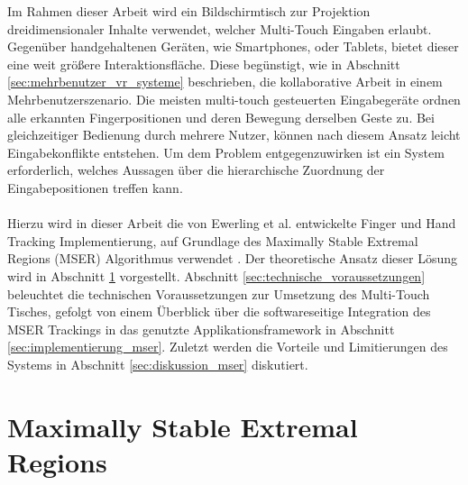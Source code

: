 Im Rahmen dieser Arbeit wird ein Bildschirmtisch zur Projektion dreidimensionaler Inhalte verwendet, welcher Multi-Touch Eingaben erlaubt. Gegenüber handgehaltenen Geräten, wie Smartphones, oder Tablets, bietet dieser eine weit größere Interaktionsfläche. Diese begünstigt, wie in Abschnitt \ref{sec:mehrbenutzer_vr_systeme} beschrieben, die kollaborative Arbeit in einem Mehrbenutzerszenario. Die meisten multi-touch gesteuerten Eingabegeräte ordnen alle erkannten Fingerpositionen und deren Bewegung derselben Geste zu. Bei gleichzeitiger Bedienung durch mehrere Nutzer, können nach diesem Ansatz leicht Eingabekonflikte entstehen. Um dem Problem entgegenzuwirken ist ein System erforderlich, welches Aussagen über die hierarchische Zuordnung der Eingabepositionen treffen kann.
\\\\
Hierzu wird in dieser Arbeit die von Ewerling et al. entwickelte Finger und Hand Tracking Implementierung, auf Grundlage des Maximally Stable Extremal Regions (MSER) Algorithmus verwendet \cite{matas:2004, ewerling:2012}. Der theoretische Ansatz dieser Lösung wird in Abschnitt \ref{sec:maximally_stable_extremal_regions} vorgestellt. Abschnitt \ref{sec:technische_voraussetzungen} beleuchtet die technischen Voraussetzungen zur Umsetzung des Multi-Touch Tisches, gefolgt von einem Überblick über die softwareseitige Integration des  MSER Trackings in das genutzte Applikationsframework in Abschnitt \ref{sec:implementierung_mser}. Zuletzt werden die Vorteile und Limitierungen des Systems in Abschnitt \ref{sec:diskussion_mser} diskutiert.


\section{Maximally Stable Extremal Regions}
\label{sec:maximally_stable_extremal_regions}

